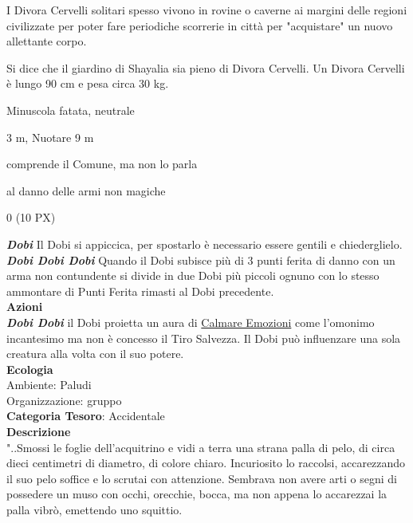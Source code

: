 \begin{multicols}{2}
{I Divora Cervelli solitari spesso vivono in rovine o caverne ai margini delle regioni civilizzate per poter fare periodiche scorrerie in città per "acquistare" un nuovo allettante corpo.

Si dice che il giardino di Shayalia sia pieno di Divora Cervelli. Un Divora Cervelli è lungo 90 cm e pesa circa 30 kg.

\begin{description}[noitemsep, topsep=0pt, parsep=0pt, partopsep=0pt, itemsep=1pt, leftmargin=2.35cm,  labelwidth=2.2cm, itemindent=0cm, listparindent=0pt] %
\setlength{\baselineskip}{10pt}
\item[\textbf{Taglia/Tipo}] Minuscola fatata, neutrale
\item[\textbf{Caratt.}] 
\item[\textbf{Punti Ferita}] 
\item[\textbf{Movimento}] 3 m, Nuotare 9 m
\item[\textbf{Tiri Salvez.}] 
\item[\textbf{Sensi}] 
\item[\textbf{Linguaggi}] comprende il Comune, ma non lo parla
\item[\textbf{Imm. Danni}] al danno delle armi non magiche
\item[\textbf{Sfida}] 0 (10 PX)
\end{description}
\smallskip

\emph{\textbf{Dobi}} Il Dobi si appiccica, per spostarlo è necessario essere gentili e chiederglielo.\\
\emph{\textbf{Dobi Dobi Dobi}} Quando il Dobi subisce più di 3 punti ferita di danno con un arma non contundente si divide in due Dobi più piccoli ognuno con lo stesso ammontare di Punti Ferita rimasti al Dobi precedente.\\
\smallskip\textbf{Azioni}\\
\emph{\textbf{Dobi Dobi}} il Dobi proietta un aura di \hyperlink{Calmare Emozioni}{Calmare Emozioni} come l'omonimo incantesimo ma non è concesso il Tiro Salvezza. Il Dobi può influenzare una sola creatura alla volta con il suo potere.\\
\textbf{Ecologia}\\
Ambiente: Paludi\\
Organizzazione: gruppo\\
\textbf{Categoria Tesoro}: Accidentale\\
\textbf{Descrizione}\\
"..Smossi le foglie dell'acquitrino e vidi a terra una strana palla di pelo, di circa dieci centimetri di diametro, di colore chiaro. Incuriosito lo raccolsi, accarezzando il suo pelo soffice e lo scrutai con attenzione. Sembrava non avere arti o segni di possedere un muso con occhi, orecchie, bocca, ma non appena lo accarezzai la palla vibrò, emettendo uno squittio.

}
\end{multicols}
